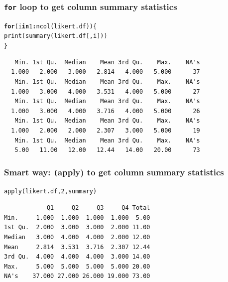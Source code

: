 \documentclass{beamer}\usepackage[]{graphicx}\usepackage[]{color}
\makeatletter
\newcommand{\hlnum}[1]{\textcolor[rgb]{0.533,0,0.133}{#1}}%
\newcommand{\hlopt}[1]{\textcolor[rgb]{0,0,0}{\textbf{#1}}}%
\newcommand{\hlstd}[1]{\textcolor[rgb]{0,0,0}{#1}}%
\newcommand{\hlkwa}[1]{\textcolor[rgb]{0.4,0.067,0.067}{\textbf{#1}}}%
\newcommand{\hlkwd}[1]{\textcolor[rgb]{0,0.267,0.4}{#1}}%
\newenvironment{kframe}{%
 \def\at@end@of@kframe{}%
 \ifinner\ifhmode%
  \def\at@end@of@kframe{\end{minipage}}%
  \begin{minipage}{\columnwidth}%
 \fi\fi%
 \def\FrameCommand##1{\hskip\@totalleftmargin \hskip-\fboxsep
 \colorbox{shadecolor}{##1}\hskip-\fboxsep
     \hskip-\linewidth \hskip-\@totalleftmargin \hskip\columnwidth}%
 \MakeFramed {\advance\hsize-\width
   \@totalleftmargin\z@ \linewidth\hsize
   \@setminipage}}%
 {\par\unskip\endMakeFramed%
 \at@end@of@kframe}
\newenvironment{knitrout}{}{} %
\makeatother
\begin{document}
\begin{frame}[fragile]
\frametitle{\texttt{for} loop to get column summary statistics}
\begin{knitrout}
\color{fgcolor}\begin{kframe}
\begin{alltt}
\hlkwa{for} \hlstd{(i} \hlkwa{in} \hlnum{1}\hlopt{:}\hlkwd{ncol}\hlstd{(likert.df))\{}
  \hlkwd{print}\hlstd{(}\hlkwd{summary}\hlstd{(likert.df[,i]))}
\hlstd{\}}
\end{alltt}
\begin{verbatim}
   Min. 1st Qu.  Median    Mean 3rd Qu.    Max.    NA's 
  1.000   2.000   3.000   2.814   4.000   5.000      37 
   Min. 1st Qu.  Median    Mean 3rd Qu.    Max.    NA's 
  1.000   3.000   4.000   3.531   4.000   5.000      27 
   Min. 1st Qu.  Median    Mean 3rd Qu.    Max.    NA's 
  1.000   3.000   4.000   3.716   4.000   5.000      26 
   Min. 1st Qu.  Median    Mean 3rd Qu.    Max.    NA's 
  1.000   2.000   2.000   2.307   3.000   5.000      19 
   Min. 1st Qu.  Median    Mean 3rd Qu.    Max.    NA's 
   5.00   11.00   12.00   12.44   14.00   20.00      73 
\end{verbatim}
\end{kframe}
\end{knitrout}
\end{frame}

\begin{frame}[fragile]
\frametitle{Smart way: \texttt(apply) to get column summary statistics}
\begin{knitrout}
\color{fgcolor}\begin{kframe}
\begin{alltt}
\hlkwd{apply}\hlstd{(likert.df,} \hlnum{2}\hlstd{, summary)}
\end{alltt}
\begin{verbatim}
            Q1     Q2     Q3     Q4 Total
Min.     1.000  1.000  1.000  1.000  5.00
1st Qu.  2.000  3.000  3.000  2.000 11.00
Median   3.000  4.000  4.000  2.000 12.00
Mean     2.814  3.531  3.716  2.307 12.44
3rd Qu.  4.000  4.000  4.000  3.000 14.00
Max.     5.000  5.000  5.000  5.000 20.00
NA's    37.000 27.000 26.000 19.000 73.00
\end{verbatim}
\end{kframe}
\end{knitrout}
\end{frame}  
\end{document}
